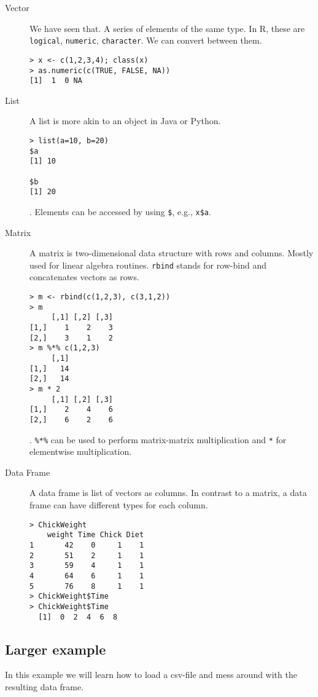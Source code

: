 \documentclass{article}[11pt]
\begin{document}
\begin{description}
\item[Vector] We have seen that. A series of elements of the same
  type. In R, these are \texttt{logical}, \texttt{numeric},
  \texttt{character}. We can convert between them.

\begin{verbatim}
> x <- c(1,2,3,4); class(x)
> as.numeric(c(TRUE, FALSE, NA))
[1]  1  0 NA
\end{verbatim}
\item[List] A list is more akin to an object in Java or Python.

\begin{verbatim}
> list(a=10, b=20)
$a
[1] 10

$b
[1] 20
\end{verbatim}. Elements can be accessed by using \texttt{\$}, e.g., \texttt{x\$a}.
\item[Matrix] A matrix is two-dimensional data structure with rows and
  columns. Mostly used for linear algebra routines. \texttt{rbind}
  stands for row-bind and concatenates vectors as rows.

\begin{verbatim}
> m <- rbind(c(1,2,3), c(3,1,2))
> m
     [,1] [,2] [,3]
[1,]    1    2    3
[2,]    3    1    2
> m %*% c(1,2,3)
     [,1]
[1,]   14
[2,]   14
> m * 2
     [,1] [,2] [,3]
[1,]    2    4    6
[2,]    6    2    6
\end{verbatim}. \texttt{\%*\%} can be used to perform matrix-matrix multiplication and \texttt{*} for elementwise multiplication.
\item[Data Frame] A data frame is list of vectors as columns. In contrast to a matrix, a data frame can have different types for each column.

\begin{verbatim}
> ChickWeight
    weight Time Chick Diet
1       42    0     1    1
2       51    2     1    1
3       59    4     1    1
4       64    6     1    1
5       76    8     1    1
> ChickWeight$Time
> ChickWeight$Time
  [1]  0  2  4  6  8
\end{verbatim}
\end{description}

\subsection*{Larger example}

In this example we will learn how to load a csv-file and mess around
with the resulting data frame.
\end{document}
